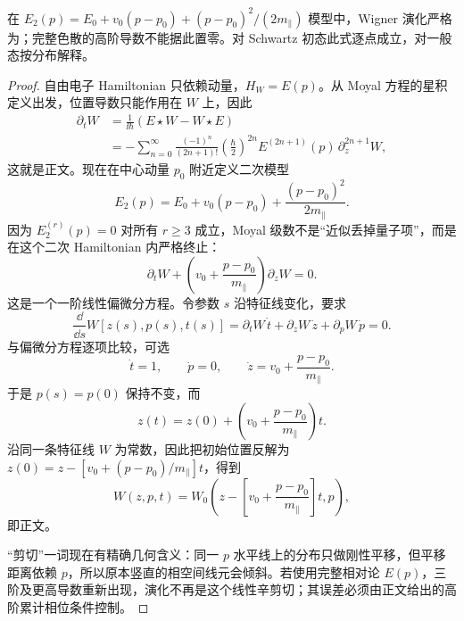 \begin{proposition}
在 $E_2(p)=E_0+v_0(p-p_0)+(p-p_0)^2/(2m_\parallel)$ 模型中，Wigner 演化严格为；完整色散的高阶导数不能据此置零。对 Schwartz 初态此式逐点成立，对一般态按分布解释。
\end{proposition}
\begin{proof}
自由电子 Hamiltonian 只依赖动量，$H_W=E(p)$。从 Moyal 方程的星积定义出发，位置导数只能作用在 $W$ 上，因此
\begin{align*}
 \partial_tW
 &=\frac{1}{\ii\hbar}(E\star W-W\star E)\\
 &=-\sum_{n=0}^{\infty}
 \frac{(-1)^n}{(2n+1)!}
 \left(\frac{\hbar}{2}\right)^{2n}
 E^{(2n+1)}(p)\,\partial_z^{2n+1}W,
\end{align*}
这就是正文。现在在中心动量 $p_0$ 附近定义二次模型
\begin{equation*}
 E_2(p)=E_0+v_0(p-p_0)+\frac{(p-p_0)^2}{2m_\parallel}.
\end{equation*}
因为 $E_2^{(r)}(p)=0$ 对所有 $r\ge3$ 成立，Moyal 级数不是“近似丢掉量子项”，而是在这个二次 Hamiltonian 内严格终止：
\begin{equation*}
 \partial_tW+
 \left(v_0+\frac{p-p_0}{m_\parallel}\right)\partial_zW=0.
\end{equation*}
这是一个一阶线性偏微分方程。令参数 $s$ 沿特征线变化，要求
\begin{equation*}
 \frac{\dd}{\dd s}W[z(s),p(s),t(s)]
 =\partial_tW\,\dot t+
 \partial_zW\,\dot z+
 \partial_pW\,\dot p=0.
\end{equation*}
与偏微分方程逐项比较，可选
\begin{equation*}
 \dot t=1,
 \qquad
 \dot p=0,
 \qquad
 \dot z=v_0+\frac{p-p_0}{m_\parallel}.
\end{equation*}
于是 $p(s)=p(0)$ 保持不变，而
\begin{equation*}
 z(t)=z(0)+
 \left(v_0+\frac{p-p_0}{m_\parallel}\right)t.
\end{equation*}
沿同一条特征线 $W$ 为常数，因此把初始位置反解为
$z(0)=z-[v_0+(p-p_0)/m_\parallel]t$，得到
\begin{equation*}
 W(z,p,t)=W_0\!\left(
 z-\left[v_0+\frac{p-p_0}{m_\parallel}\right]t,
 p\right),
\end{equation*}
即正文。

“剪切”一词现在有精确几何含义：同一 $p$ 水平线上的分布只做刚性平移，但平移距离依赖 $p$，所以原本竖直的相空间线元会倾斜。若使用完整相对论 $E(p)$，三阶及更高导数重新出现，演化不再是这个线性辛剪切；其误差必须由正文给出的高阶累计相位条件控制。
\end{proof}


